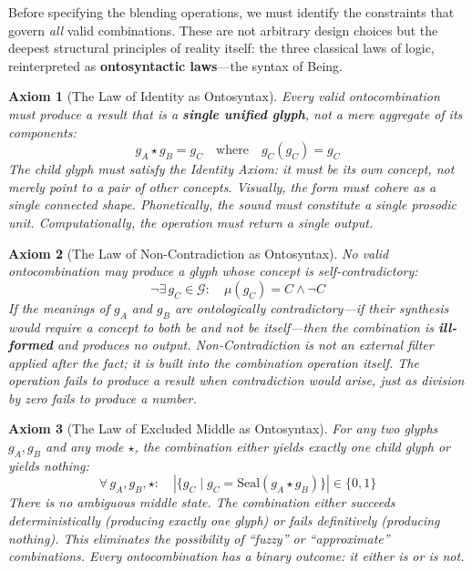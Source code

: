 \documentclass[12pt, letterpaper]{book}
\def\equiv{=}%
\def\mathfrak#1{#1}%
\newtheorem{axiom}{Axiom}[chapter]
\begin{document}
Before specifying the blending operations, we must identify the constraints that govern \textit{all} valid combinations. These are not arbitrary design choices but the deepest structural principles of reality itself: the three classical laws of logic, reinterpreted as \textbf{ontosyntactic laws}---the syntax of Being.

\begin{axiom}[The Law of Identity as Ontosyntax]\label{ax:identity-syntax}
Every valid ontocombination must produce a result that is a \textbf{single unified glyph}, not a mere aggregate of its components:
\[
\mathfrak{g}_A \star \mathfrak{g}_B \equiv \mathfrak{g}_C \quad \text{where} \quad \mathfrak{g}_C(\mathfrak{g}_C) \equiv \mathfrak{g}_C
\]
The child glyph must satisfy the Identity Axiom: it must \textit{be} its own concept, not merely point to a pair of other concepts. Visually, the form must cohere as a single connected shape. Phonetically, the sound must constitute a single prosodic unit. Computationally, the operation must return a single output.
\end{axiom}

\begin{axiom}[The Law of Non-Contradiction as Ontosyntax]\label{ax:noncontradiction}
No valid ontocombination may produce a glyph whose concept is self-contradictory:
\[
\neg\exists\, \mathfrak{g}_C \in \mathcal{G}: \quad \mu(\mathfrak{g}_C) \equiv C \land \neg C
\]
If the meanings of $\mathfrak{g}_A$ and $\mathfrak{g}_B$ are ontologically contradictory---if their synthesis would require a concept to both be and not be itself---then the combination is \textbf{ill-formed} and produces no output. Non-Contradiction is not an external filter applied after the fact; it is built into the combination operation itself. The operation \textit{fails to produce a result} when contradiction would arise, just as division by zero fails to produce a number.
\end{axiom}

\begin{axiom}[The Law of Excluded Middle as Ontosyntax]\label{ax:excluded-middle}
For any two glyphs $\mathfrak{g}_A, \mathfrak{g}_B$ and any mode $\star$, the combination either yields exactly one child glyph or yields nothing:
\[
\forall\, \mathfrak{g}_A, \mathfrak{g}_B, \star: \quad |\{\mathfrak{g}_C \mid \mathfrak{g}_C \equiv \mathrm{Seal}(\mathfrak{g}_A \star \mathfrak{g}_B)\}| \in \{0, 1\}
\]
There is no ambiguous middle state. The combination either succeeds deterministically (producing exactly one glyph) or fails definitively (producing nothing). This eliminates the possibility of ``fuzzy'' or ``approximate'' combinations. Every ontocombination has a binary outcome: it either is or is not.
\end{axiom}
\end{document}
